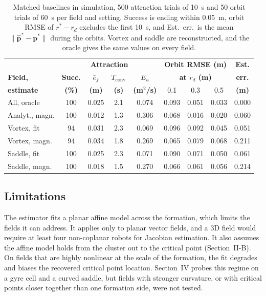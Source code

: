 \documentclass[lettersize,journal]{IEEEtran}
\newcommand{\rev}[1]{#1}                             %
\begin{document}
\begin{table}[!t]
\centering
\scriptsize
\caption{Matched baselines in simulation, \rev{500} attraction trials of 10~s and \rev{50} orbit trials of 60~s per field and setting. Success is ending within 0.05~m, orbit RMSE of $r^* - r_d$ excludes the first 10~s, and Est.\ err.\ is the mean $\|\hat{\mathbf{p}}^* - \mathbf{p}^*\|$ during the orbits. Vortex and saddle are reconstructed, and the oracle gives the same values on every field.} %
\label{tab:baselines}
\setlength{\tabcolsep}{2pt}
\rev{\begin{tabular}{lcccc|ccc|c}
\hline
 & \multicolumn{4}{c|}{\textbf{Attraction}} & \multicolumn{3}{c|}{\textbf{Orbit RMSE (m)}} & \textbf{Est.} \\
\textbf{Field,} & \textbf{Succ.} & \textbf{$\bar{e}_f$} & \textbf{$T_{\mathrm{conv}}$} & \textbf{$E_u$} & \multicolumn{3}{c|}{\textbf{at $r_d$ (m)}} & \textbf{err.} \\
\textbf{estimate} & \textbf{(\%)} & \textbf{(m)} & \textbf{(s)} & \textbf{(m$^2$/s)} & 0.1 & 0.3 & 0.5 & \textbf{(m)} \\
\hline
All, oracle & 100 & 0.025 & 2.1 & 0.074 & 0.093 & 0.051 & 0.033 & 0.000 \\
Analyt., magn. & 100 & 0.012 & 1.3 & 0.306 & 0.068 & 0.016 & 0.020 & 0.060 \\
Vortex, fit & 94 & 0.031 & 2.3 & 0.069 & 0.096 & 0.092 & 0.045 & 0.051 \\
Vortex, magn. & 94 & 0.034 & 1.8 & 0.269 & 0.065 & 0.079 & 0.068 & 0.211 \\
Saddle, fit & 100 & 0.025 & 2.3 & 0.071 & 0.090 & 0.071 & 0.050 & 0.061 \\
Saddle, magn. & 100 & 0.018 & 1.5 & 0.270 & 0.066 & 0.061 & 0.056 & 0.214 \\
\hline
\end{tabular}} %
\end{table}


\subsection{Limitations}

The estimator fits a planar affine model across the formation, which limits the fields it can address. It applies only to planar vector fields, and a 3D field would require at least four non-coplanar robots for Jacobian estimation. It also assumes the affine model holds from the cluster out to the critical point (Section~II-B). On fields that are highly nonlinear at the scale of the formation, the fit degrades and biases the recovered critical point location. Section~IV probes this regime on a gyre cell and a curved saddle, but fields with stronger curvature, or with critical points closer together than one formation side, were not tested.
\end{document}
